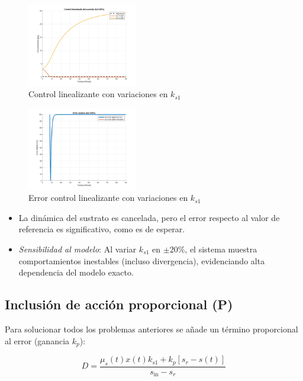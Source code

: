 \documentclass[letterpaper, 10 pt, conference]{ieeeconf}  %
\begin{document}
\begin{figure}[h]
  \centering
  \includegraphics[width=0.43\textwidth]{./images_tp3/lin_ks1.png}
  \caption{Control linealizante con variaciones en $k_{s1}$}
\end{figure}
\begin{figure}[h]
  \centering
  \includegraphics[width=0.43\textwidth]{./images_tp3/lin_err_ks1.png}
  \caption{Error control linealizante con variaciones en $k_{s1}$}
\end{figure}

\begin{itemize}
    \item La dinámica del sustrato es cancelada, pero el error respecto al valor de referencia es significativo, como es de esperar.  
    \item \textit{Sensibilidad al modelo}: Al variar \(k_{s1}\) en \(\pm 20\%\), el sistema muestra comportamientos inestables (incluso divergencia), evidenciando alta dependencia del modelo exacto.  
\end{itemize}  

\subsection{Inclusión de acción proporcional (P)}  
Para solucionar todos los problemas anteriores se añade un término proporcional al error (ganancia \(k_p\)):  

\begin{equation}
D = \frac{\mu_s(t) x(t) k_{s1} + k_p [s_r - s(t)]}{s_{\text{in}} - s_r}
\end{equation}
\end{document}
